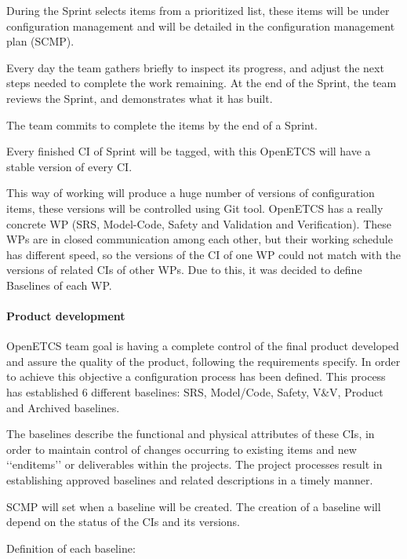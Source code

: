 \documentclass{template/openetcs_article}
\begin{document}
During the Sprint selects items from a prioritized list, these items will be under configuration management and will be detailed in the configuration management plan (SCMP). 

Every day the team gathers briefly to inspect its progress, and adjust the next steps needed to complete the work remaining. At the end of the Sprint, the team reviews the Sprint, and demonstrates what it has built. 

The team commits to complete the items by the end of a Sprint.

Every finished CI of Sprint will be tagged, with this OpenETCS will have a stable version of every CI.

This way of working will produce a huge number of versions of configuration items, these versions will be controlled using Git tool. OpenETCS has a really concrete WP (SRS, Model-Code, Safety and Validation and Verification). These WPs are in closed communication among each other, but their working schedule has different speed, so the versions of the CI of one WP could not match with the versions of related CIs of other WPs. Due to this, it was decided to define Baselines of each WP.


\paragraph{Product development}

OpenETCS team goal is having a complete control of the final product developed and assure the quality of the product, following the requirements specify. In order to achieve this objective a configuration process has been defined. This process has established 6 different baselines: SRS, Model/Code, Safety, V\&V, Product and Archived baselines. 


The baselines describe the functional and physical attributes of these CIs, in order to maintain control of changes occurring to existing items and new `{}`enditems'{}' or deliverables within the projects. The project processes result in establishing approved baselines and related descriptions in a timely manner. 

SCMP will set when a baseline will be created. The creation of a baseline will depend on the status of the CIs and its versions.


Definition of each baseline:
\end{document}
